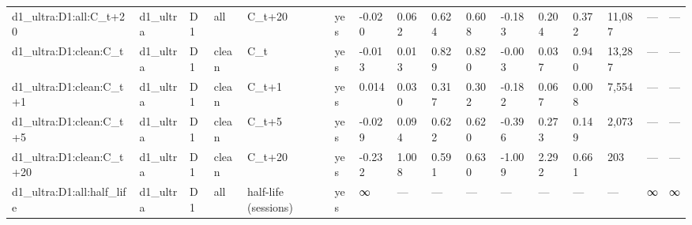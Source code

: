 \begin{tabular}{llllllllllllllll}
d1\_ultra:D1:all:C\_t+20 & d1\_ultra & D1 & all & C\_t+20 & yes & -0.020 & 0.062 & 0.624 & 0.608 & -0.183 & 0.204 & 0.372 & 11,087 & — & — \\
d1\_ultra:D1:clean:C\_t & d1\_ultra & D1 & clean & C\_t & yes & -0.013 & 0.013 & 0.829 & 0.820 & -0.003 & 0.037 & 0.940 & 13,287 & — & — \\
d1\_ultra:D1:clean:C\_t+1 & d1\_ultra & D1 & clean & C\_t+1 & yes & 0.014 & 0.030 & 0.317 & 0.302 & -0.182 & 0.067 & 0.008 & 7,554 & — & — \\
d1\_ultra:D1:clean:C\_t+5 & d1\_ultra & D1 & clean & C\_t+5 & yes & -0.029 & 0.094 & 0.622 & 0.620 & -0.396 & 0.273 & 0.149 & 2,073 & — & — \\
d1\_ultra:D1:clean:C\_t+20 & d1\_ultra & D1 & clean & C\_t+20 & yes & -0.232 & 1.008 & 0.591 & 0.630 & -1.009 & 2.292 & 0.661 & 203 & — & — \\
d1\_ultra:D1:all:half\_life & d1\_ultra & D1 & all & half-life (sessions) & yes & ∞ & — & — & — & — & — & — & — & ∞ & ∞ \\
\bottomrule
\end{tabular}
